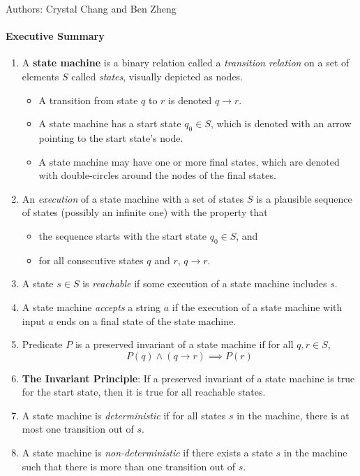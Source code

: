 \documentclass[solution, letterpaper]{cs20inclass}
\begin{document}

\noindent Authors: Crystal Chang and Ben Zheng

\paragraph*{Executive Summary}
\begin{enumerate}

\item A \textbf{state machine} is a binary relation called a \textit{transition relation} on a set of elements $S$ called \textit{states}, visually depicted as nodes.
\begin{itemize}
\item A transition from state $q$ to $r$ is denoted $q \rightarrow r$.
\item A state machine has a start state $q_0 \in S$, which is denoted with an arrow pointing to the start state's node.
\item A state machine may have one or more final states, which are denoted with double-circles around the nodes of the final states.
\end{itemize}
\item An \textit{execution} of a state machine with a set of states $S$ is a plausible sequence of states (possibly an infinite one) with the property that
\begin{itemize}
\item the sequence starts with the start state $q_0 \in S$, and
\item for all consecutive states $q$ and $r$, $q \rightarrow r$.
\end{itemize}
\item A state $s \in S$ is \textit{reachable} if some execution of a state machine includes $s$.
\item A state machine \textit{accepts} a string $a$ if the execution of a state machine with input $a$ ends on a final state of the state machine.
\item Predicate $P$ is a preserved invariant of a state machine if for all $q,r \in S$,
$$P(q) \wedge (q \rightarrow r) \implies P(r)$$
\item \textbf{The Invariant Principle}: If a preserved invariant of a state machine is true for the start state, then it is true for all reachable states.
\item A state machine is \textit{deterministic} if for all states $s$ in the machine, there is at most one transition out of $s$.
\item A state machine is \textit{non-deterministic} if there exists a state $s$ in the machine such that there is more than one transition out of $s$.
\end{enumerate}
\end{document}
